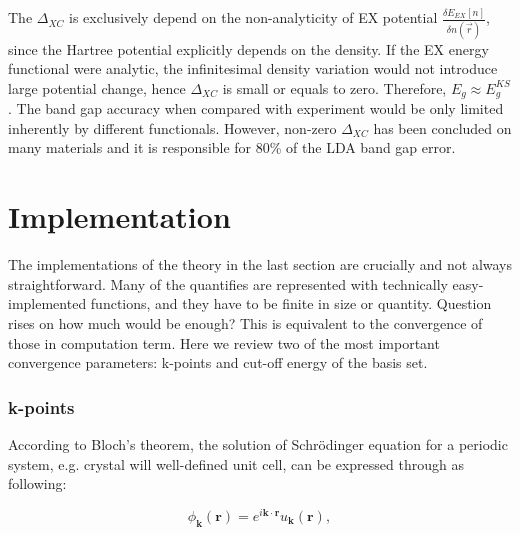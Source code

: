 The $\Delta_{XC}$ is exclusively depend on the non-analyticity of EX potential $\frac{\delta E_{EX}[n]}{\delta n(\vec{r})}$, since the Hartree potential explicitly depends on the density. If the EX energy functional were analytic, the infinitesimal density variation would not introduce large potential change, hence $\Delta_{XC}$ is small or equals to zero. Therefore, $E_g \approx E^{KS}_g$. The band gap accuracy when compared with experiment would be only limited inherently by different functionals. However, non-zero $\Delta_{XC}$ has been concluded on many materials and it is responsible for 80\% of the LDA band gap error\cite{Godby1988}. 

\section{Implementation}

The implementations of the theory in the last section are crucially and not always straightforward. Many of the quantifies are represented with technically easy-implemented functions, and they have to be finite in size or quantity. Question rises on how much would be enough? This is equivalent to the convergence of those in computation term. Here we review two of the most important convergence parameters: k-points and cut-off energy of the basis set.

\subsubsection{k-points}

According to Bloch's theorem, the solution of Schr\"{o}dinger equation for a periodic system, e.g. crystal will well-defined unit cell, can be expressed through as following:

\begin{equation}\label{imp:bloch}
\phi_{\mathbf{k}}(\mathbf{r})=e^{i\mathbf{k}\cdot\mathbf{r}}u_{\mathbf{k}}(\mathbf{r}),
\end{equation}

